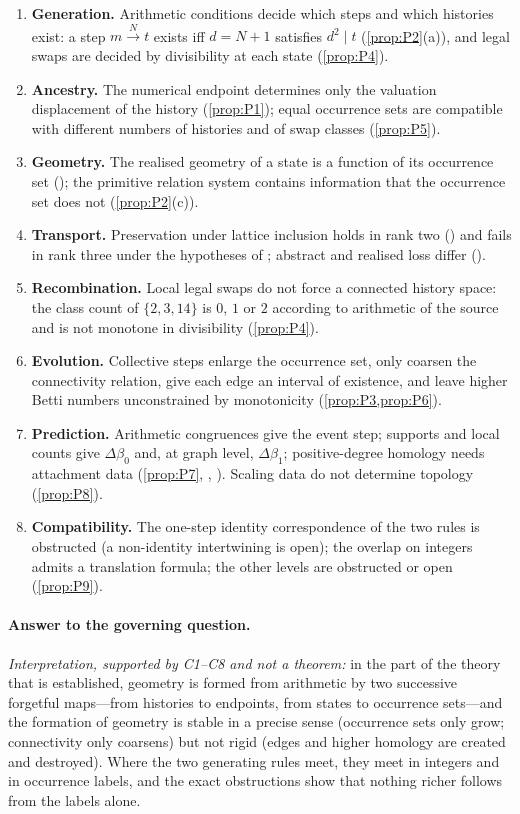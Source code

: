 \begin{enumerate}[label=\textbf{C\arabic*.},itemsep=3pt]
\item \textbf{Generation.} Arithmetic conditions decide which steps and which histories exist: a step $m\xrightarrow{N}t$ exists iff $d=N+1$ satisfies $d^2\mid t$ (\cref{prop:P2}(a)), and legal swaps are decided by divisibility at each state (\cref{prop:P4}).
\item \textbf{Ancestry.} The numerical endpoint determines only the valuation displacement of the history (\cref{prop:P1}); equal occurrence sets are compatible with different numbers of histories and of swap classes (\cref{prop:P5}).
\item \textbf{Geometry.} The realised geometry of a state is a function of its occurrence set (); the primitive relation system contains information that the occurrence set does not (\cref{prop:P2}(c)).
\item \textbf{Transport.} Preservation under lattice inclusion holds in rank two () and fails in rank three under the hypotheses of ; abstract and realised loss differ ().
\item \textbf{Recombination.} Local legal swaps do not force a connected history space: the class count of $\{2,3,14\}$ is $0$, $1$ or $2$ according to arithmetic of the source and is not monotone in divisibility (\cref{prop:P4}).
\item \textbf{Evolution.} Collective steps enlarge the occurrence set, only coarsen the connectivity relation, give each edge an interval of existence, and leave higher Betti numbers unconstrained by monotonicity (\cref{prop:P3,prop:P6}).
\item \textbf{Prediction.} Arithmetic congruences give the event step; supports and local counts give $\Delta\beta_0$ and, at graph level, $\Delta\beta_1$; positive-degree homology needs attachment data (\cref{prop:P7}, , ). Scaling data do not determine topology (\cref{prop:P8}).
\item \textbf{Compatibility.} The one-step identity correspondence of the two rules is obstructed (a non-identity intertwining is open); the overlap on integers admits a translation formula; the other levels are obstructed or open (\cref{prop:P9}).
\end{enumerate}
\paragraph{Answer to the governing question.} \emph{Interpretation, supported by C1--C8 and not a theorem:} in the part of the theory that is established, geometry is formed from arithmetic by two successive forgetful maps---from histories to endpoints, from states to occurrence sets---and the formation of geometry is stable in a precise sense (occurrence sets only grow; connectivity only coarsens) but not rigid (edges and higher homology are created and destroyed). Where the two generating rules meet, they meet in integers and in occurrence labels, and the exact obstructions show that nothing richer follows from the labels alone.

